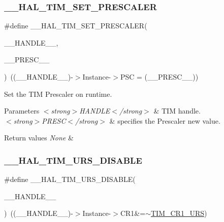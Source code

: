 \subsubsection{\texorpdfstring{\+\_\+\+\_\+\+H\+A\+L\+\_\+\+T\+I\+M\+\_\+\+S\+E\+T\+\_\+\+P\+R\+E\+S\+C\+A\+L\+ER}{\_\_HAL\_TIM\_SET\_PRESCALER}}
{\footnotesize\ttfamily \#define \+\_\+\+\_\+\+H\+A\+L\+\_\+\+T\+I\+M\+\_\+\+S\+E\+T\+\_\+\+P\+R\+E\+S\+C\+A\+L\+ER(\begin{DoxyParamCaption}\item[{}]{\+\_\+\+\_\+\+H\+A\+N\+D\+L\+E\+\_\+\+\_\+,  }\item[{}]{\+\_\+\+\_\+\+P\+R\+E\+S\+C\+\_\+\+\_\+ }\end{DoxyParamCaption})~((\+\_\+\+\_\+\+H\+A\+N\+D\+L\+E\+\_\+\+\_\+)-\/$>$Instance-\/$>$P\+SC = (\+\_\+\+\_\+\+P\+R\+E\+S\+C\+\_\+\+\_\+))}



Set the T\+IM Prescaler on runtime. 


\begin{DoxyParams}{Parameters}
{\em $<$strong$>$\+H\+A\+N\+D\+L\+E$<$/strong$>$} & T\+IM handle. \\
\hline
{\em $<$strong$>$\+P\+R\+E\+S\+C$<$/strong$>$} & specifies the Prescaler new value. \\
\hline
\end{DoxyParams}

\begin{DoxyRetVals}{Return values}
{\em None} & \\
\hline
\end{DoxyRetVals}
\mbox{\label{group___t_i_m___exported___macros_gafacb551a4c537e62a0fe740b2f12236c}} 
\subsubsection{\texorpdfstring{\+\_\+\+\_\+\+H\+A\+L\+\_\+\+T\+I\+M\+\_\+\+U\+R\+S\+\_\+\+D\+I\+S\+A\+B\+LE}{\_\_HAL\_TIM\_URS\_DISABLE}}
{\footnotesize\ttfamily \#define \+\_\+\+\_\+\+H\+A\+L\+\_\+\+T\+I\+M\+\_\+\+U\+R\+S\+\_\+\+D\+I\+S\+A\+B\+LE(\begin{DoxyParamCaption}\item[{}]{\+\_\+\+\_\+\+H\+A\+N\+D\+L\+E\+\_\+\+\_\+ }\end{DoxyParamCaption})~((\+\_\+\+\_\+\+H\+A\+N\+D\+L\+E\+\_\+\+\_\+)-\/$>$Instance-\/$>$C\+R1\&=$\sim$\hyperlink{group___peripheral___registers___bits___definition_ga06c997c2c23e8bef7ca07579762c113b}{T\+I\+M\+\_\+\+C\+R1\+\_\+\+U\+RS})}




